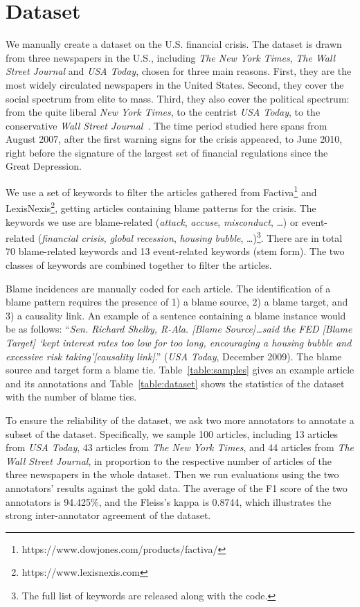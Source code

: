 \documentclass[letterpaper]{article} %
\begin{document}
\section{Dataset}
\label{dataset}

We manually create a dataset on the U.S. financial crisis. The dataset is drawn from three newspapers in the U.S., including {\it The New York Times}, {\it The Wall Street Journal} and {\it USA Today}, chosen for three main reasons. First, they are the most widely circulated newspapers in the United States. Second, they cover the social spectrum from elite to mass. Third, they also cover the political spectrum: from the quite liberal {\it New York Times}, to the centrist {\it USA Today}, to the conservative {\it Wall Street Journal}~\cite{gentzkow2010drives,groseclose2005measure}. The time period studied here spans from August 2007, after the first warning signs for the crisis appeared, to June 2010, right before the signature of the largest set of financial regulations since the Great Depression.

We use a set of keywords to filter the articles gathered from Factiva\footnote{https://www.dowjones.com/products/factiva/} and LexisNexis\footnote{https://www.lexisnexis.com}, getting articles containing blame patterns for the crisis. The keywords we use are blame-related ({\it attack}, {\it accuse}, {\it misconduct}, \ldots) or event-related ({\it financial crisis}, {\it global recession}, {\it housing bubble}, \ldots)\footnote{The full list of keywords are released along with the code.}. There are in total 70 blame-related keywords and 13 event-related keywords (stem form). The two classes of keywords are combined together to filter the articles.

Blame incidences are manually coded for each article. The identification of a blame pattern requires the presence of 1) a blame source, 2) a blame target, and 3) a causality link. An example of a sentence containing a blame instance would be as follows: ``{\it Sen. Richard Shelby, R-Ala. [Blame Source]\ldots said the FED [Blame Target] `kept interest rates too low for too long, encouraging a housing bubble and excessive risk taking'[causality link]}.'' ({\it USA Today}, December 2009). The blame source and target form a blame tie. Table~\ref{table:samples} gives an example article and its annotations and Table~\ref{table:dataset} shows the statistics of the dataset with the number of blame ties.

To ensure the reliability of the dataset, we ask two more annotators to annotate a subset of the dataset. Specifically, we sample 100 articles, including 13 articles from {\it USA Today}, 43 articles from {\it The New York Times}, and 44 articles from {\it The Wall Street Journal}, in proportion to the respective number of articles of the three newspapers in the whole dataset. Then we run evaluations using the two annotators' results against the gold data. The average of the F1 score of the two annotators is 94.425\%, and the Fleiss's kappa is 0.8744, which illustrates the strong inter-annotator agreement of the dataset.
\end{document}
